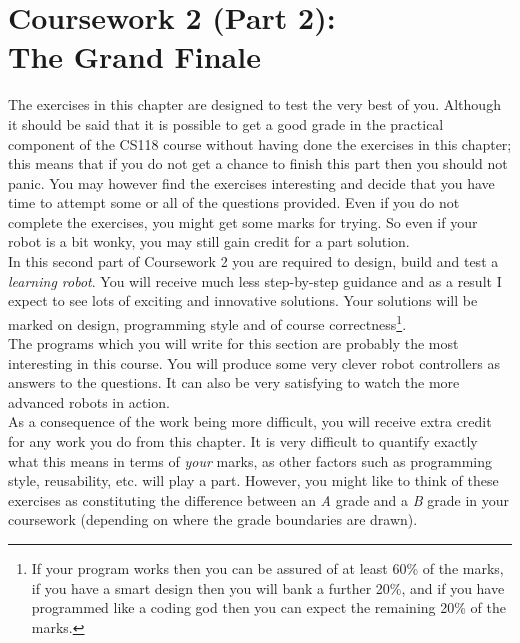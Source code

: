 \clearpage
\section{Coursework 2 (Part 2): \\
         The Grand Finale}

The exercises in this chapter are designed to test the very best of you. 
Although it should be said that it is 
possible to get a good grade in the practical component of the CS118 
course without having done the exercises in this chapter; 
this means that if you do 
not get a chance to finish this part then you should not panic. You may 
however find the exercises interesting and decide that you have time to 
attempt some or all of the questions provided. Even if you do not complete 
the exercises, you might get some marks for trying. So even if your robot 
is a bit wonky, you may still gain credit for a part solution. \\

\noindent
In this second part of Coursework 2 you are required to design, build and 
test a {\em learning robot}. You will receive much less step-by-step 
guidance and as a result I expect to see lots of exciting and innovative 
solutions. Your solutions will be marked on design, programming style and 
of course correctness\footnote{If your program works then you can be 
assured of at least 60\% of the marks, if you have a smart design then 
you will bank a further 20\%, and if you have programmed like a coding god 
then you can expect the remaining 20\% of the marks.}.\\

\noindent
The programs which you will write for this section are probably the most 
interesting in this course. You will produce some very clever robot 
controllers as answers to the questions. It can also be very satisfying to 
watch the more advanced robots in action. \\

\noindent
As a consequence of the work being more difficult, you will receive extra 
credit for any work you do from this chapter. It is very difficult to quantify
exactly what this means in terms of {\it your} marks, as other factors such as 
programming style, reusability, etc. will play a part. However, you might 
like to think of these exercises as constituting the difference between an 
{\em A} grade and a {\em B} grade in your coursework (depending on 
where the grade boundaries are drawn). \\

